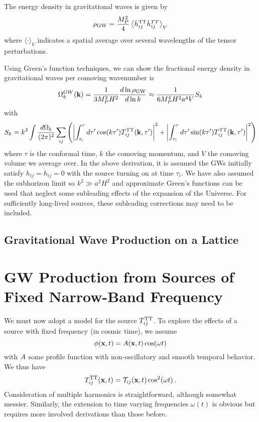 \documentclass{revtex4}
\begin{document}
The energy density in gravitational waves is given by
\begin{equation}
  \rho_{\rm GW} = \frac{M_P^2}{4}\left\langle\dot{h}_{ij}^{\rm TT}\dot{h}_{ij}^{TT}\right\rangle_V
\end{equation}
where $\langle\cdot\rangle_V$ indicates a spatial average over several wavelengths of the tensor perturbations.

Using Green's function techniques, we can show the fractional energy density in gravitational waves per comoving wavenumber is
\begin{equation}
  \Omega_k^{GW}({\bf k}) = \frac{1}{3M_P^2H^2}\frac{d\ln\rho_{\rm GW}}{d\ln k} \approx \frac{1}{6M_P^4H^2a^4V}S_k
\end{equation}
with
\begin{equation}
  S_k = k^3\int \frac{d\Omega_k}{(2\pi)^2}\sum_{ij}\left(\left|\int_{\tau_i}^\tau d\tau'\cos(k\tau')T_{ij}^{{\rm TT}}({\bf k},\tau')\right|^2 + \left|\int_{\tau_i}^\tau d\tau'\sin(k\tau')T_{ij}^{{\rm TT}}({\bf k},\tau')\right|^2 \right)
\end{equation}
where $\tau$ is the conformal time, $k$ the comoving momentum, and $V$ the comoving volume we average over.
In the above derivation, it is assumed the GWs initially satisfy $h_{ij}=\dot{h}_{ij}=0$ with the source turning on at time $\tau_i$.
We have also assumed the subhorizon limit so $k^2 \gg a^2H^2$ and approximate Green's functions can be used that neglect some subleading effects of the expansion of the Universe.
For sufficiently long-lived sources, these subleading corrections may need to be included.

\subsection{Gravitational Wave Production on a Lattice}

\section{GW Production from Sources of Fixed Narrow-Band Frequency}
We must now adopt a model for the source $T_{ij}^{{\rm TT}}$.
To explore the effects of a source with fixed frequency (in cosmic time), we assume
\begin{equation}
  \phi({\bf x},t) = A({\bf x},t)\cos(\omega t)
\end{equation}
with $A$ some profile function with non-oscillatory and smooth temporal behavior.
We thus have
\begin{equation}
  T_{ij}^{{\rm TT}}({\bf x},t) = \mathcal{T}_{ij}({\bf x},t)\cos^2(\omega t) \, .
\end{equation}
Consideration of multiple harmonics is straightforward, although somewhat messier.
Similarly, the extension to time varying frequencies $\omega(t)$ is obvious but requires more involved derivations than those before.
\end{document}

